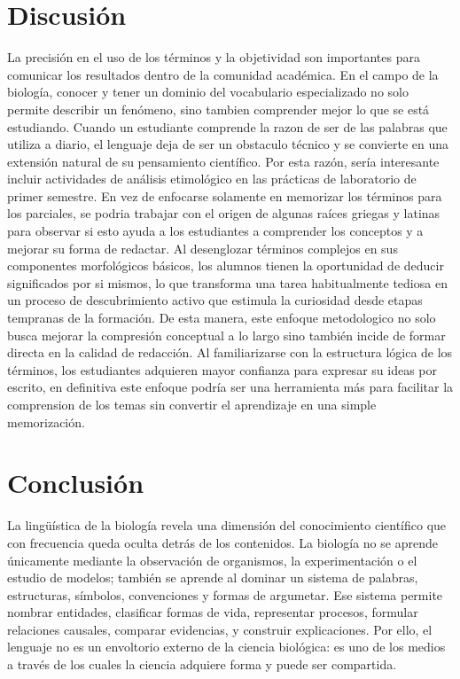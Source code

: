 \documentclass[12pt]{article}
\begin{document}
\section{Discusión}
La precisión en el uso de los términos y la objetividad son importantes para comunicar los resultados dentro de la comunidad académica. En el campo de la biología, conocer y tener un dominio del vocabulario especializado no solo permite describir un fenómeno, sino tambien comprender mejor lo que se está estudiando. Cuando un estudiante comprende la razon de ser de las palabras que utiliza a diario, el lenguaje deja de ser un obstaculo técnico y se convierte en una extensión natural de su pensamiento científico. Por esta razón, sería interesante incluir actividades de análisis etimológico en las prácticas de laboratorio de primer semestre. En vez de enfocarse solamente en memorizar los términos para los parciales, se podria trabajar con el origen de algunas raíces griegas y latinas para observar si esto ayuda a los estudiantes a comprender los conceptos y a mejorar su forma de redactar. Al desenglozar términos complejos en sus componentes morfológicos básicos, los alumnos tienen la oportunidad de deducir significados por si mismos, lo que transforma una tarea habitualmente tediosa en un proceso de descubrimiento activo que estimula la curiosidad desde etapas tempranas de la formación. De esta manera, este enfoque metodologico no solo busca mejorar la compresión conceptual a lo largo sino también incide de formar directa en la calidad de redacción. Al familiarizarse con la estructura lógica de los términos, los estudiantes adquieren mayor confianza para expresar su ideas por escrito, en definitiva este enfoque podría ser una herramienta más para facilitar la comprension de los temas sin convertir el aprendizaje en una simple memorización.

\section{Conclusión}
La lingüística de la biología revela una dimensión del conocimiento científico que con frecuencia queda oculta detrás de los contenidos. La biología no se aprende únicamente mediante la observación de organismos, la experimentación o el estudio de modelos; también se aprende al dominar un sistema de palabras, estructuras, símbolos, convenciones y formas de argumetar. Ese sistema permite nombrar entidades, clasificar formas de vida, representar procesos, formular relaciones causales, comparar evidencias, y construir explicaciones. Por ello, el lenguaje no es un envoltorio externo de la ciencia biológica: es uno de los medios a través de los cuales la ciencia adquiere forma y puede ser compartida.
\end{document}

